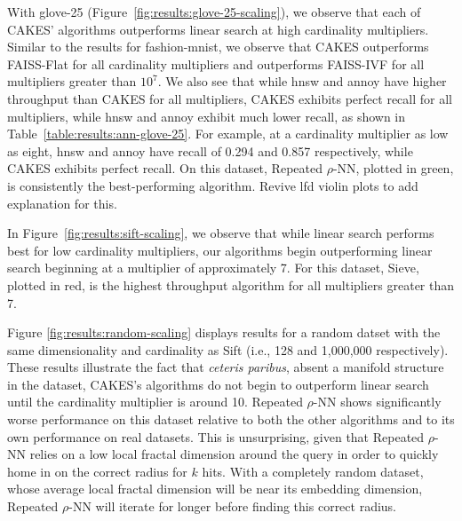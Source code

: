 With glove-25 (Figure~\ref{fig:results:glove-25-scaling}), we observe that each of CAKES' algorithms outperforms linear search at high cardinality multipliers. Similar to the results for fashion-mnist, we observe that CAKES outperforms FAISS-Flat for all cardinality multipliers and outperforms FAISS-IVF for all multipliers greater than $10^{7}$. We also see that while hnsw and annoy have higher throughput than CAKES for all multipliers, CAKES exhibits perfect recall for all multipliers, while hnsw and annoy exhibit much lower recall, as shown in Table~\ref{table:results:ann-glove-25}. For example, at a cardinality multiplier as low as eight, hnsw and annoy have recall of 0.294 and 0.857 respectively, while CAKES exhibits perfect recall.
On this dataset, Repeated $\rho$-NN, plotted in green, is consistently the best-performing algorithm. {\color{red} Revive lfd violin plots to add explanation for this.}


In Figure~\ref{fig:results:sift-scaling}, we observe that while linear search performs best for low cardinality multipliers, our algorithms begin outperforming linear search beginning at a multiplier of approximately 7. 
For this dataset, Sieve, plotted in red, is the highest throughput algorithm for all multipliers greater than 7. 

Figure \ref{fig:results:random-scaling} displays results for a random datset with the same dimensionality and cardinality as Sift (i.e., 128 and 1,000,000 respectively). 
These results illustrate the fact that \emph{ceteris paribus}, absent a manifold structure in the dataset, CAKES's algorithms do not begin to outperform linear search until the cardinality multiplier is around 10. 
Repeated $\rho$-NN shows significantly worse performance on this dataset relative to both the other algorithms and to its own performance on real datasets. 
This is unsurprising, given that Repeated $\rho$-NN relies on a low local fractal dimension around the query in order to quickly home in on the correct radius for $k$ hits. 
With a completely random dataset, whose average local fractal dimension will be near its embedding dimension, Repeated $\rho$-NN will iterate for longer before finding this correct radius. 

